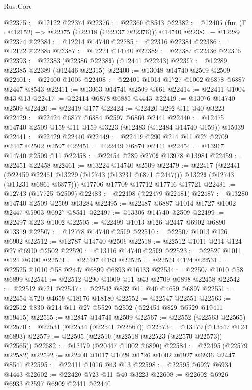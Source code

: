 \begin{lexlean}{RustCore}
\begin{coremodule}
@22375 := @12122 @22374
@22376 := @22360 @8543
@22382 := @12405 (fun (Γ : @12152) => @22375 (@22318 (@22337 @22376))) @14740
@22383 := @12289 @22374
@22384 := @12214 @14740
@22385 := @22316 @22384
@22386 := @12122 @22385
@22387 := @12221 @14740
@22389 := @22387 @22336 @22376
@22393 := @22383 (@22386 @22389) (@12441 @22243)
@22397 := @12289 @22385 @22389 (@12446 @22315)
@22400 := @13048 @14740 @2509 @2509
@22401 := @22400 @1005
@22408 := @22401 @1014 @1727 @1002 @6878 @6887 @2447 @8543
@22411 := @13063 @14740 @2509 @661
@22414 := @22411 @1004 @43 @13
@22417 := @22414 @6878 @6885 @4443
@22419 := @13076 @14740 @2509
@22420 := @22419 @177
@22424 := @22420 @292 @11 @40 @3223
@22429 := @22424 @6877 @6884 @2597 @6860 @2441
@22440 := @12475 @14740 @2509 @159 @11 @159 @3223 (@12483 (@12484 @14740 @159)) @15039
@22441 := @22429 @22440
@22449 := @22419 @290 @214 @11 @27 @2709 @2447 @2502 @2597
@22451 := @22449 @6870 @2441
@22454 := @13967 @14740 @2509 @11
@22458 := @22454 @289 @2709 @13978 @13984
@22459 := @22451 @22458
@22461 := @13224 @14740 @2509
@22479 := @22417
    (@22441
      (@22459 @22461 @13229 (@12743 (@13231 @6871 @2447)))
      @13229
      (@12743 (@13231 @6861 @6877)))
    @17706
    @17709
    @17712
    @17716
    @17721
@22481 := @12743 (@17725 @2509)
@22483 := @22408 (@22479 @22481)
@22487 := @13280 @14740 @2509 @2509 @13284
@22495 := @22487 @6887 @1014 @1727 @1002 @2447 @6903 @6927 @8541
@22497 := @13306 @14740 @2509
@22499 := @22497 @223 @1002
@22505 := @22499 @1013 @126 @2447 @6902 @6890 @13319
@22507 := @12778 @14740 @2509
@22510 := @22507 @1013 @126 @6902
@22512 := @12787 @14740 @2509
@22518 := @22512 @1011 @214 @124 @27 @6900 @2502
@22520 := @13116 @14740 @2509
@22523 := @22520 @1011 @124 @6900
@22524 := @22497 @183
@22525 := @22524 @124
@22531 := @22525 @1010 @58 @2447 @6899 @6893 @16133
@22534 := @22507 @1010 @58 @6899
@22541 := @22512 @290 @1009 @11 @43 @2709 @6898 @22458
@22542 := @22512 @721
@22547 := @22542 @832 @11 @40 @4659 @6897
@22551 := @22454 @720 @4659 @18176 @18180
@22552 := @22547 @22551
@22563 := @22512 @830 @214 @11 @27 @5529 @2502 (@22454 @829 @5529 @19411 @19415)
@22565 := @12847 @14740 @2509
@22567 := @22552 (@22563 @22565)
@22570 := @22531 (@22534 (@22541 @22567))
@22573 := @13179 (@13547 @124 @6893)
@22579 := @22505 (@22510 (@22518 (@22523 (@22570 @22573)) @22565))
@22582 := @13179 (@20447 @1002 @6890)
@22584 := @22495 (@22579 @22582)
@22592 := @22400 @1017 @1028 @1726 @1002 @6927 @6936 @2447 @8541
@22595 := @22411 @1016 @43 @13
@22598 := @22595 @6927 @6934 @4443
@22602 := @22420 @723 @11 @40 @3223
@22608 := @22602 @6926 @6933 @2597 @6909 @2441 @22440

\end{coremodule}
\end{lexlean}
